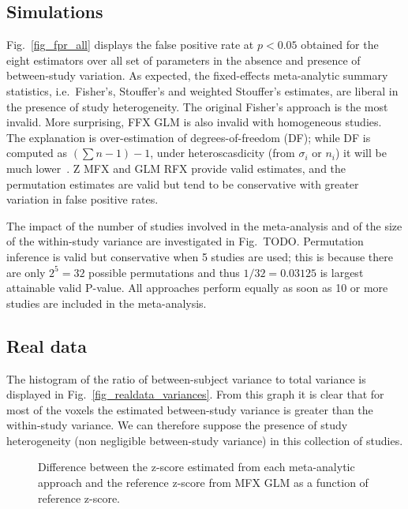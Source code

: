 \documentclass[preprint]{elsarticle}
\newcommand{\sampleSize}[1][i]{n_{#1}}
\begin{document}
\subsection{Simulations}
Fig.~\ref{fig_fpr_all} displays the false positive rate at $p<0.05$ obtained for the eight estimators over all set of parameters in the absence and presence of between-study variation. As expected, the fixed-effects meta-analytic summary statistics, i.e.\ Fisher's, Stouffer's and weighted Stouffer's estimates, are liberal in the presence of study heterogeneity. The original Fisher's approach is the most invalid. More surprising, FFX GLM is also invalid with homogeneous studies. The explanation is over-estimation of degrees-of-freedom (DF); while DF is computed as $(\sum n-1)-1$, under heteroscasdicity (from $\sigma_i$ or $\sampleSize$) it will be much lower~\cite{Satterthwaite}. Z MFX and GLM RFX provide valid estimates, and the permutation estimates are valid but tend to be conservative with greater variation in false positive rates.

The impact of the number of studies involved in the meta-analysis and of the size of the within-study variance are investigated in Fig.~TODO. Permutation inference is valid but conservative when 5 studies are used; this is because there are only $2^5=32$ possible permutations and thus $1/32=0.03125$ is largest attainable valid P-value. All approaches perform equally as soon as 10 or more studies are included in the meta-analysis. 


\subsection{Real data}



The histogram of the ratio of between-subject variance to total variance is displayed in Fig.~\ref{fig_realdata_variances}. From this graph it is clear that for most of the voxels the estimated between-study variance is greater than the within-study variance. We can therefore suppose the presence of study heterogeneity (non negligible between-study variance) in this collection of studies.

\begin{figure}[t]
	\centering
	\caption{Difference between the z-score estimated from each meta-analytic approach and the reference z-score from MFX GLM as a function of reference z-score.}
	\label{fig_realdata}
\end{figure}
\end{document}
